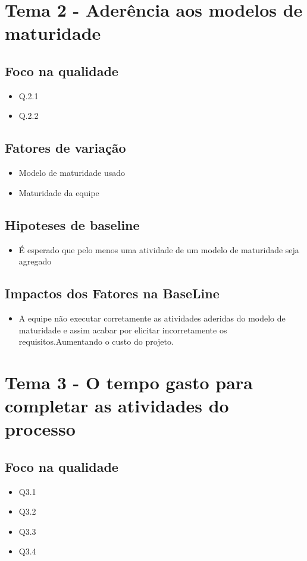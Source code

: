 \section{Tema 2 - Aderência aos modelos de maturidade}

	\subsection{Foco na qualidade}
		\begin{itemize}  
		\item Q.2.1
		\item Q.2.2
		\end{itemize}
	\subsection{Fatores de variação}
		\begin{itemize}  
		\item Modelo de maturidade usado
		\item Maturidade da equipe
		\end{itemize}
	\subsection{Hipoteses de baseline}
		\begin{itemize}  
		\item É esperado que pelo menos uma atividade de um modelo de maturidade seja agregado
		\end{itemize}
	\subsection{Impactos dos Fatores na BaseLine}
		\begin{itemize}  
		\item A equipe não executar corretamente as atividades aderidas do modelo de maturidade e assim acabar por elicitar incorretamente os requisitos.Aumentando o custo do projeto.
		\end{itemize}


\section{Tema 3 - O tempo gasto para completar as atividades do processo}

	\subsection{Foco na qualidade}
		\begin{itemize}  
		\item Q3.1
		\item Q3.2
		\item Q3.3
		\item Q3.4
		\end{itemize}
